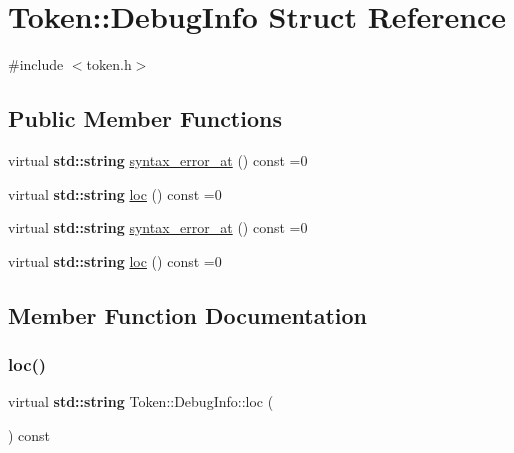 \hypertarget{struct_token_1_1_debug_info}{}\section{Token\+:\+:Debug\+Info Struct Reference}
\label{struct_token_1_1_debug_info}


{\ttfamily \#include $<$token.\+h$>$}

\subsection*{Public Member Functions}
\begin{DoxyCompactItemize}
\item 
virtual \textbf{ std\+::string} \hyperlink{struct_token_1_1_debug_info_a4d66aa65422c236198bbcc616bba250f}{syntax\+\_\+error\+\_\+at} () const =0
\item 
virtual \textbf{ std\+::string} \hyperlink{struct_token_1_1_debug_info_a0860d9b875240dafa0e00756d27e55bb}{loc} () const =0
\item 
virtual \textbf{ std\+::string} \hyperlink{struct_token_1_1_debug_info_a4d66aa65422c236198bbcc616bba250f}{syntax\+\_\+error\+\_\+at} () const =0
\item 
virtual \textbf{ std\+::string} \hyperlink{struct_token_1_1_debug_info_a0860d9b875240dafa0e00756d27e55bb}{loc} () const =0
\end{DoxyCompactItemize}


\subsection{Member Function Documentation}
\mbox{\label{struct_token_1_1_debug_info_a0860d9b875240dafa0e00756d27e55bb}} 
\subsubsection{\texorpdfstring{loc()}{loc()}\hspace{0.1cm}{\footnotesize\ttfamily [1/2]}}
{\footnotesize\ttfamily virtual \textbf{ std\+::string} Token\+::\+Debug\+Info\+::loc (\begin{DoxyParamCaption}{ }\end{DoxyParamCaption}) const\hspace{0.3cm}{\ttfamily [pure virtual]}}

